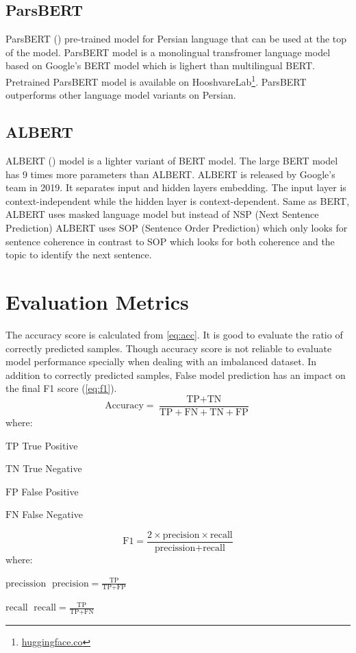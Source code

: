 \subsection{ParsBERT}
ParsBERT (\cite{parsbert}) pre-trained model for Persian language that can be used at the top of the model. ParsBERT model is a monolingual transfromer language model based on Google's BERT model \cite{bert} which is lighert than multilingual BERT. Pretrained ParsBERT model is available on HooshvareLab\footnote{\href{https://huggingface.co/HooshvareLab}{huggingface.co}}. ParsBERT outperforms other language model variants on Persian.

\subsection{ALBERT}
ALBERT (\cite{albert}) model is a lighter variant of BERT model. The large BERT model has 9 times more parameters than ALBERT. ALBERT is released by Google's team in 2019. It separates input and hidden layers embedding. The input layer is context-independent while the hidden layer is context-dependent. Same as BERT, ALBERT uses masked language model but instead of NSP (Next Sentence Prediction) ALBERT uses SOP (Sentence Order Prediction) which only looks for sentence coherence in contrast to SOP which looks for both coherence and the topic to identify the next sentence.

 

\section{Evaluation Metrics}
\label{lr:evalmetrics}
The accuracy score is calculated from \ref{eq:acc}. It is good to evaluate the ratio of correctly predicted samples. Though accuracy score is not reliable to evaluate model performance specially when dealing with an imbalanced dataset. In addition to correctly predicted samples, False model prediction has an impact on the final F1 score (\ref{eq:f1}).   
\begin{equation}
\label{eq:acc}
\text{Accuracy} = \frac{\text{TP} + \text{TN} }{\text{TP} + \text{FN} + \text{TN} + \text{FP}}
\end{equation}
where:
\begin{eqexpl}[25mm]
	\item{$\text{TP}$} True Positive
	\item{$\text{TN}$} True Negative
	\item{$\text{FP}$} False Positive 
	\item{$\text{FN}$} False Negative
\end{eqexpl}

\begin{equation}
\label{eq:f1}
\text{F1} = \frac{2 \times \text{precision} \times \text{recall} }{\text{precission} + \text{recall}}
\end{equation}
where: 
\begin{eqexpl}[25mm]
	\item{$\text{precission}$} $\; \text{precision} = \frac{\text{TP}}{\text{TP} + \text{FP}} \;$
	\item{$\text{recall}$} $\; \text{recall} = \frac{\text{TP}}{\text{TP} + \text{FN}} \;$ 
\end{eqexpl}
